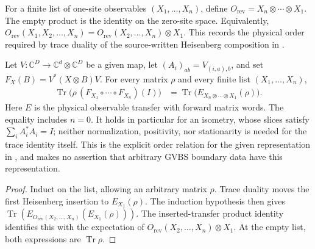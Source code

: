 \begin{definition}
    \label{def:source_reversed_product_observable}
    \leanok
    For a finite list of one-site observables $(X_1,\ldots,X_n)$, define
    $O_{\mathrm{rev}}=X_n\otimes\cdots\otimes X_1$. The empty product
    is the identity on the zero-site space. Equivalently,
    $O_{\mathrm{rev}}(X_1,X_2,\ldots,X_n)
        =O_{\mathrm{rev}}(X_2,\ldots,X_n)\otimes X_1$.
    This records the physical order required by trace duality of the
    source-written Heisenberg composition in
    \cite[equations~(3.5)--(3.6)]{Nachtergaele1996Spectral}.
\end{definition}

\begin{lemma}
    \label{thm:source_ordered_heisenberg_trace_reversal}
    \leanok
    Let $V:\mathbb C^D\to\mathbb C^d\otimes\mathbb C^D$ be a given
    map, let $(A_i)_{ab}=V_{(i,a),b}$, and set
    $F_X(B)=V^*(X\otimes B)V$. For every matrix $\rho$ and every finite
    list $(X_1,\ldots,X_n)$,
    \begin{align}
        \operatorname{Tr}\bigl(\rho\,
        (F_{X_1}\circ\cdots\circ F_{X_n})(I)\bigr)
         & =\operatorname{Tr}\bigl(E_{X_n\otimes\cdots\otimes X_1}(\rho)\bigr).
    \end{align}
    Here $E$ is the physical observable transfer with forward matrix words.
    The equality includes $n=0$. It holds in particular for an isometry,
    whose slices satisfy $\sum_iA_i^*A_i=I$; neither normalization,
    positivity, nor stationarity is needed for the trace identity itself.
    This is the explicit order relation for the given representation in
    \cite[equations~(3.5)--(3.6)]{Nachtergaele1996Spectral}, and makes no
    assertion that arbitrary GVBS boundary data have this representation.
\end{lemma}
\begin{proof}\leanok
    Induct on the list, allowing an arbitrary matrix $\rho$. Trace duality
    moves the first Heisenberg insertion to $E_{X_1}(\rho)$.
    The induction hypothesis then gives
    $\operatorname{Tr}(E_{O_{\mathrm{rev}}(X_2,\ldots,X_n)}
        (E_{X_1}(\rho)))$.
    The inserted-transfer product identity identifies this with the
    expectation of $O_{\mathrm{rev}}(X_2,\ldots,X_n)\otimes X_1$.
    At the empty list, both expressions are $\operatorname{Tr}\rho$.
\end{proof}

